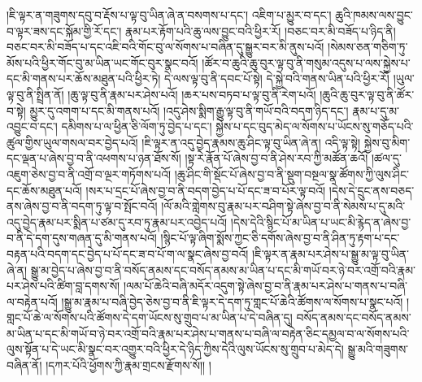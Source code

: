 །ཇི་ལྟར་ན་གཟུགས་དབུ་བ་རྡོས་པ་ལྟ་བུ་ཡིན་ཞེ་ན་བསགས་པ་དང་། འཇིག་པ་མྱུར་བ་དང་། ཆུའི་ཁམས་ལས་བྱུང་བ་ལྟར་ཟས་དང་སྐོམ་གྱི་རོ་དང་། རྣམ་པར་རྟོག་པའི་ཆུ་ལས་བྱུང་བའི་ཕྱིར་རོ། །བཅང་བར་མི་བཟོད་པ་ཉིད་ནི། བཅང་བར་མི་བཟོད་པ་དང་འཇི་བའི་གོང་བུ་ལ་སོགས་པ་བཞིན་དུ་སྒྱུར་བར་མི་ནུས་པའོ། །སེམས་ཅན་གཅིག་ཏུ་མོས་པའི་ཕྱིར་གོང་བུ་མ་ཡིན་ཡང་གོང་བུར་སྣང་བའོ། །ཚོར་བ་ཆུའི་ཆུ་བུར་ལྟ་བུ་ནི་གསུམ་འདུས་པ་ལས་སྐྱེས་པ་དང་མི་གནས་པར་ཆོས་མཐུན་པའི་ཕྱིར་ཏེ། དེ་ལས་ལྟ་བུ་ནི་དབང་པོ་སྟེ། དེ་སྐྱེ་བའི་གནས་ཡིན་པའི་ཕྱིར་རོ། །ཡུལ་ལྟ་བུ་ནི་སྤྲིན་ནོ། །ཆུ་ལྟ་བུ་ནི་རྣམ་པར་ཤེས་པའོ། །ཆར་པས་བཏབ་པ་ལྟ་བུ་ནི་རེག་པའོ། །ཆུའི་ཆུ་བུར་ལྟ་བུ་ནི་ཚོར་བ་སྟེ། མྱུར་དུ་འགག་པ་དང་མི་གནས་པའོ། །འདུ་ཤེས་སྨིག་རྒྱུ་ལྟ་བུ་ནི་གཡོ་བའི་བདག་ཉིད་དང་། རྣམ་པ་དུ་མ་འབྱུང་བ་དང་། དམིགས་པ་ལ་ཕྱིན་ཅི་ལོག་ཏུ་བྱེད་པ་དང་། སྐྱེས་པ་དང་བུད་མེད་ལ་སོགས་པ་ཡོངས་སུ་གཅོད་པའི་ཚུལ་གྱིས་ཡུལ་གསལ་བར་བྱེད་པའོ། །ཇི་ལྟར་ན་འདུ་བྱེད་རྣམས་ཆུ་ཤིང་ལྟ་བུ་ཡིན་ཞེ་ན། འདི་ལྟ་སྟེ། སྐྱེས་བུ་མིག་དང་ལྡན་པ་ཞེས་བྱ་བ་ནི་འཕགས་པ་ཉན་ཐོས་སོ། །སྟ་རེ་རྣོན་པོ་ཞེས་བྱ་བ་ནི་ཤེས་རབ་ཀྱི་མཚོན་ཆའོ། །ཚལ་དུ་འཇུག་ཅེས་བྱ་བ་ནི་འགྲོ་བ་ལྔར་གཏོགས་པའོ། །ཆུ་ཤིང་གི་སྡོང་པོ་ཞེས་བྱ་བ་ནི་སྡུག་བསྔལ་སྣ་ཚོགས་ཀྱི་ལུས་ཤིང་དང་ཆོས་མཐུན་པའོ། །སར་པ་དྲང་པོ་ཞེས་བྱ་བ་ནི་བདག་བྱེད་པ་པོ་དང་ཟ་བ་པོར་ལྟ་བའོ། །དེས་དེ་དྲུང་ནས་བཅད་ནས་ཞེས་བྱ་བ་ནི་བདག་ཏུ་ལྟ་བ་སྤོང་བའོ། །ལོ་མའི་གླེགས་བུ་རྣམ་པར་བཤིག་སྟེ་ཞེས་བྱ་བ་ནི་སེམས་པ་དུ་མའི་འདུ་བྱེད་རྣམ་པར་སྨིན་པ་ཙམ་དུ་རབ་ཏུ་རྣམ་པར་འབྱེད་པའོ། །དེས་དེའི་སྙིང་པོ་མ་ཡིན་པ་ཡང་མི་རྙེད་ན་ཞེས་བྱ་བ་ནི་དེ་དག་དུས་གཞན་དུ་མི་གནས་པའོ། །སྙིང་པོ་ལྟ་ཞིག་སྨོས་ཀྱང་ཅི་དགོས་ཞེས་བྱ་བ་ནི་ཤིན་ཏུ་རྟག་པ་དང་བརྟན་པའི་བདག་དང་བྱེད་པ་པོ་དང་ཟ་བ་པོ་ག་ལ་སྣང་ཞེས་བྱ་བའོ། །ཇི་ལྟར་ན་རྣམ་པར་ཤེས་པ་སྒྱུ་མ་ལྟ་བུ་ཡིན་ཞེ་ན། སྒྱུ་མ་བྱེད་པ་ཞེས་བྱ་བ་ནི་བསོད་ནམས་དང་བསོད་ནམས་མ་ཡིན་པ་དང་མི་གཡོ་བར་ཉེ་བར་འགྲོ་བའི་རྣམ་པར་ཤེས་པའི་ཚིག་བླ་དགས་སོ། །ལམ་པོ་ཆེའི་བཞི་མདོར་འདུག་སྟེ་ཞེས་བྱ་བ་ནི་རྣམ་པར་ཤེས་པ་གནས་པ་བཞི་ལ་བརྟེན་པའོ། །སྒྱུ་མ་རྣམ་པ་བཞི་བྱེད་ཅེས་བྱ་བ་ནི་ཇི་ལྟར་དེ་དག་ཏུ་གླང་པོ་ཆེའི་ཚོགས་ལ་སོགས་པ་སྣང་པའོ། །གླང་པོ་ཆེ་ལ་སོགས་པའི་ཚོགས་དེ་དག་ཡོངས་སུ་གྲུབ་པ་མ་ཡིན་པ་དེ་བཞིན་དུ། བསོད་ནམས་དང་བསོད་ནམས་མ་ཡིན་པ་དང་མི་གཡོ་བ་ཉེ་བར་འགྲོ་བའི་རྣམ་པར་ཤེས་པ་གནས་པ་བཞི་ལ་བརྟེན་ཅིང་དམྱལ་བ་ལ་སོགས་པའི་ལུས་སྟོན་པ་དེ་ཡང་མི་སྣང་བར་འགྱུར་བའི་ཕྱིར་དེ་ཉིད་ཀྱིས་དེའི་ལུས་ཡོངས་སུ་གྲུབ་པ་མེད་དེ། སྒྱུ་མའི་གཟུགས་བཞིན་ནོ། །དཀར་པོའི་ཕྱོགས་ཀྱི་རྣམ་གྲངས་རྫོགས་སོ།། །
